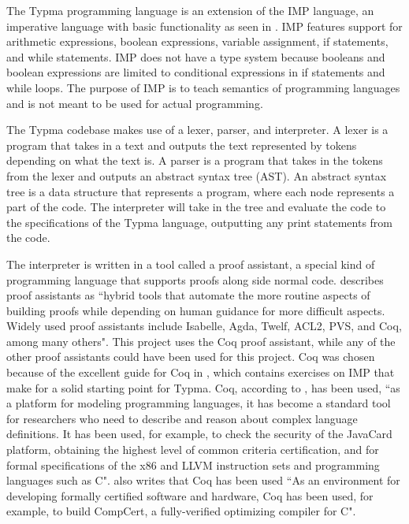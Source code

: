 \documentclass[10pt,twocolumn]{article}
\begin{document}
The Typma programming language is an extension of the IMP language, an imperative language with basic functionality as seen in \textcite{CS4110IMP}. IMP features support for arithmetic expressions, boolean expressions, variable assignment, if statements, and while statements. IMP does not have a type system because booleans and boolean expressions are limited to conditional expressions in if statements and while loops. The purpose of IMP is to teach semantics of programming languages and is not meant to be used for actual programming.

The Typma codebase makes use of a lexer, parser, and interpreter. A lexer is a program that takes in a text and outputs the text represented by tokens depending on what the text is. A parser is a program that takes in the tokens from the lexer and outputs an abstract syntax tree (AST). An abstract syntax tree is a data structure that represents a program, where each node represents a part of the code. The interpreter will take in the tree and evaluate the code to the specifications of the Typma language, outputting any print statements from the code. 

The interpreter is written in a tool called a proof assistant, a special kind of programming language that supports proofs along side normal code.  \textcite{Pierce2021Software} describes proof assistants as ``hybrid tools that automate the more routine aspects of building proofs while depending on human guidance for more difficult aspects. Widely used proof assistants include Isabelle, Agda, Twelf, ACL2, PVS, and Coq, among many others". This project uses the Coq proof assistant, while any of the other proof assistants could have been used for this project. Coq was chosen because of the excellent guide for Coq in \textcite{Pierce2021Software}, which contains exercises on IMP that make for a solid starting point for Typma. Coq, according to \textcite{Pierce2021Software}, has been used, ``as a platform for modeling programming languages, it has become a standard tool for researchers who need to describe and reason about complex language definitions. It has been used, for example, to check the security of the JavaCard platform, obtaining the highest level of common criteria certification, and for formal specifications of the x86 and LLVM instruction sets and programming languages such as C". \textcite{Pierce2021Software} also writes that Coq has been used ``As an environment for developing formally certified software and hardware, Coq has been used, for example, to build CompCert, a fully-verified optimizing compiler for C".
\end{document}
